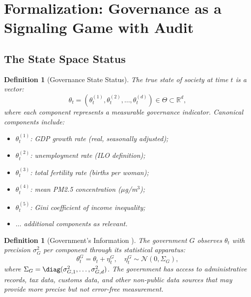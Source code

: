\documentclass[11pt,a4paper]{article}
\newtheorem{definition}[theorem]{Definition}
\theoremstyle{definition}
\newcommand{\R}{\mathbb{R}}
\newcommand{\stateSpace}{\Theta}
\begin{document}
\section{Formalization: Governance as a Signaling Game with Audit}
\label{sec:formalization}
\subsection{The State Space Status}
\begin{definition}[Governance State Status]
\label{def:state}
The true state of society at time $t$ is a vector:
\begin{equation}
    \theta_t = (\theta_t^{(1)}, \theta_t^{(2)}, \ldots, \theta_t^{(d)}) \in \stateSpace \subset \R^d,
    \label{eq:state}
\end{equation}
where each component represents a measurable governance indicator. Canonical components include:
\begin{itemize}
    \item $\theta_t^{(1)}$: GDP growth rate (real, seasonally adjusted);
    \item $\theta_t^{(2)}$: unemployment rate (ILO definition);
    \item $\theta_t^{(3)}$: total fertility rate (births per woman);
    \item $\theta_t^{(4)}$: mean PM2.5 concentration ($\mu$g/m$^3$);
    \item $\theta_t^{(5)}$: Gini coefficient of income inequality;
    \item $\dots$ additional components as relevant.
\end{itemize}
\end{definition}
\begin{definition}[Government's Information ]
\label{def:gov_info}
The government $G$ observes $\theta_t$ with precision $\sigma_G^2$ per component through its statistical apparatus:
\begin{equation}
    \theta_t^G = \theta_t + \eta_t^G, \quad \eta_t^G \sim \mathcal{N}(0, \Sigma_G),
    \label{eq:gov_info}
\end{equation}
where $\Sigma_G = \diag(\sigma_{G,1}^2, \ldots, \sigma_{G,d}^2)$. The government has access to administrative records, tax data, customs data, and other non-public data sources that may provide more precise but not error-free measurement.
\end{definition}
\end{document}
